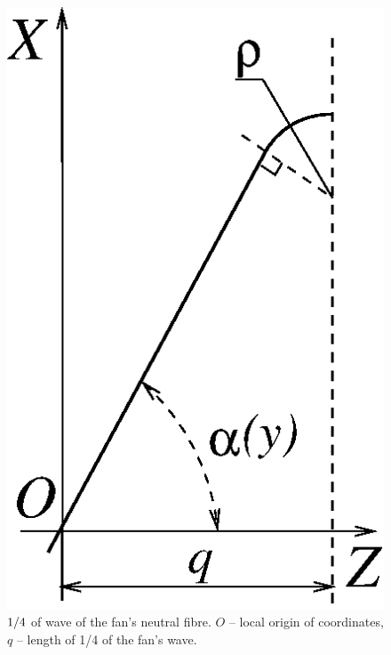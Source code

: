\begin{figure}
\centering
\includegraphics{qwave.eps}
\caption{$1/4\/$ of wave of the fan's neutral fibre. $O$ -- local origin of
coordinates, $q$ -- length of 1/4 of the fan's wave.}
\label{qwave}
\end{figure}
